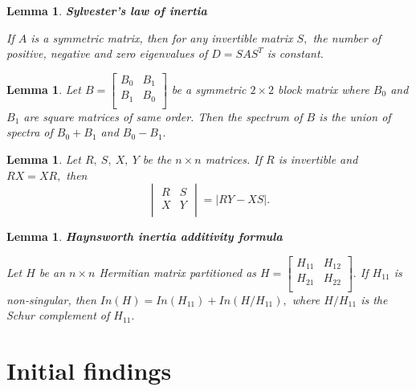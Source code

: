 \documentclass[10pt,a4paper,oneside]{article}
\newtheorem{lemma}[theorem]{Lemma}
\begin{document}
\begin{lemma}\label{4.5} \cite{24}
\textbf{Sylvester's law of inertia}
	
If $A$ is a symmetric matrix, then for any invertible matrix $S,$ the number of positive, negative and zero eigenvalues of $D=SAS^{T}$ is constant.
\end{lemma}

\begin{lemma}\label{4.6} \cite{17}
	Let $B=\begin{bmatrix}
		B_0 & B_1\\
		B_1 & B_0\\
	\end{bmatrix}$ be a symmetric $2\times 2$ block matrix where $B_0$ and $B_1$ are square matrices of same order. Then the spectrum of $B$ is the union of spectra of $B_0+B_1$ and $B_0-B_1.$
\end{lemma}
\begin{lemma}\label{4.7}\cite{18}
	Let $R,\ S,\ X,\ Y$ be the $n\times n$ matrices. If $R$ is invertible and $RX=XR,$ then $$\begin{vmatrix}
		R & S\\
		X & Y\\
	\end{vmatrix}=\vert RY-XS\vert. $$
\end{lemma}


\begin{lemma}\label{4.8}\cite{19}
\textbf{Haynsworth inertia additivity formula}
	
	Let $H$ be an $n\times n$ Hermitian matrix partitioned as $H= \begin{bmatrix}
		H_{11} & H_{12}\\
		H_{21} & H_{22}\\
	\end{bmatrix}.$
	If $H_{11}$ is non-singular, then $In(H)=In(H_{11})+In(H/H_{11}),$ where $H/H_{11}$ is the Schur complement of $H_{11}.$
\end{lemma}


\section{Initial findings}
\end{document}
